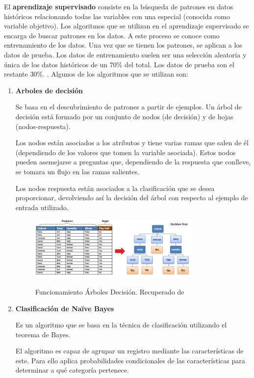 El \textbf{aprendizaje supervisado} consiste en la búsqueda de patrones en datos históricos relacionando todas las variables con una especial (conocida como variable objetivo). Los algoritmos que se utilizan en el aprendizaje supervisado se encarga de buscar patrones en los datos. A este proceso se conoce como entrenamiento de los datos. Una vez que se tienen los patrones, se aplican a los datos de prueba. Los datos de entrenamiento suelen ser una selección aleatoria y única de los datos históricos de un 70\% del total. Los datos de prueba son el restante 30\%. \cite{Manguart2017}.
Algunos de los algoritmos que se utilizan son:
\begin{enumerate}
	\item \textbf{Arboles de decisión}
	
	Se basa en el descubrimiento de patrones a partir de ejemplos. Un árbol de decisión está formado por un conjunto de nodos (de decisión) y de hojas (nodos-respuesta).
	
	Los nodos están asociados a los atributos y tiene varias ramas que salen de él (dependiendo de los valores que tomen la variable asociada). Estos nodos pueden asemejarse a preguntas que, dependiendo de la respuesta que conlleve, se tomara un flujo en las ramas salientes.
	
	Los nodos respuesta están asociados a la clasificación que se desea proporcionar, devolviendo así la decisión del árbol con respecto al ejemplo de entrada utilizado.
	
	\begin{figure}[htb]
		\centering
		\caption{Funcionamiento Árboles Decisión. Recuperado de \protect{}}
		\includegraphics[width=0.8\textwidth]{recursos/arbol_decision_img1}
		\label{fig:fun_arb_dec}
	\end{figure}
	\FloatBarrier
	
	
	\item \textbf{Clasificación de Naïve Bayes}
	
	Es un algoritmo que se basa en la técnica de clasificación utilizando el teorema de Bayes.
	
	El algoritmo es capaz de agrupar un registro mediante las características de este. Para ello aplica probabilidades condicionales de las características para determinar a qué categoría pertenece. 
	

\end{enumerate}
